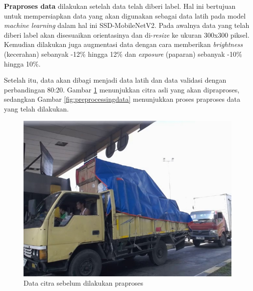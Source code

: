 \textbf{Praproses data} dilakukan setelah data telah diberi label. Hal ini bertujuan untuk mempersiapkan data yang akan digunakan sebagai data latih pada model \emph{machine learning} dalam hal ini SSD-MobileNetV2. Pada awalnya data yang telah diberi label akan disesuaikan orientasinya dan di-\emph{resize} ke ukuran 300x300 piksel. Kemudian dilakukan juga augmentasi data dengan cara memberikan \emph{brightness} (kecerahan) sebanyak -12\% hingga 12\% dan \emph{exposure} (paparan) sebanyak -10\% hingga 10\%.

Setelah itu, data akan dibagi menjadi data latih dan data validasi dengan perbandingan 80:20. Gambar \ref{fig:citraasli} menunjukkan citra asli yang akan dipraproses, sedangkan Gambar \ref{fig:preprocessingdata} menunjukkan proses praproses data yang telah dilakukan.

\begin{figure}[htbp]
  \centering

  \includegraphics[scale=0.5]{gambar/bab3-citra-asli.jpg}
  \caption{Data citra sebelum dilakukan praproses}
  \label{fig:citraasli}
  
\end{figure}

